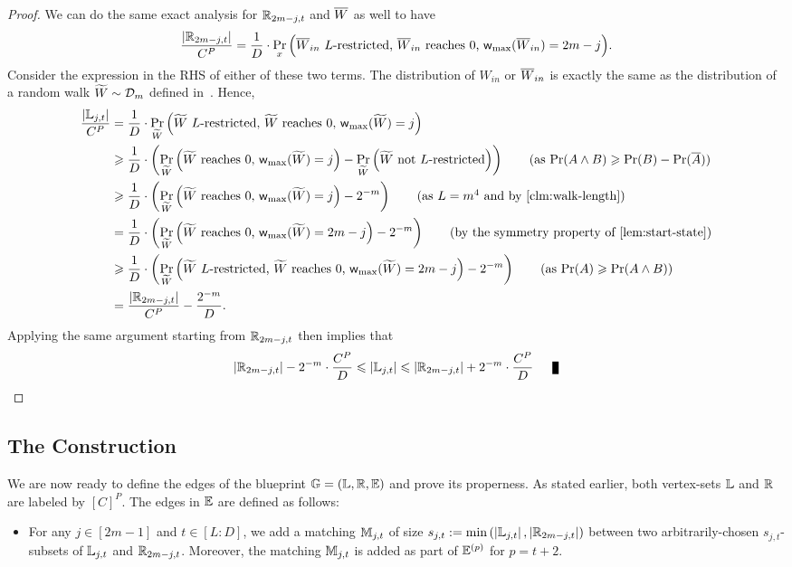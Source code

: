 \begin{proof}
	We can do the same exact analysis for $\mathbb{R}_{2m-j,t}$ and $\overline{W}$ as well to have 
	\[
		\frac{\left\vert{\mathbb{R}_{2m-j,t}}\right\vert}{C^P} = \frac{1}{D} \cdot \operatorname*{\textnormal{Pr}}_{x}\Big(\text{$\overline{W}_{in}$ $L$-restricted, $\overline{W}_{in}$ reaches $0$, $\textnormal{\textsf{w}}_{\textnormal{max}}(\overline{W}_{in})=2m-j$}\Big). 
	\]
	Consider the expression in the RHS of either of these two terms. The distribution of $W_{in}$ or $\overline{W}_{in}$ is exactly the same as the distribution of a random walk $\widetilde{W} \sim \mathcal{D}_m$ defined in~. Hence,  
	\begin{align*}
		\frac{\card{\bL_{j,t}}}{C^P} &=  \frac{1}{D} \cdot \Pr_{\widetilde{W}}\Paren{\text{$\widetilde{W}$ $L$-restricted, $\widetilde{W}$ reaches $0$, $\maxwalk{\widetilde{W}}=j$}} \\
		&\geq \frac{1}{D} \cdot \paren{\Pr_{\widetilde{W}}\Paren{\text{$\widetilde{W}$ reaches $0$, $\maxwalk{\widetilde{W}}=j$}} - \Pr_{\widetilde{W}}\Paren{\text{$\widetilde{W}$ not $L$-restricted}}} \tag{as $\Pr(A \wedge B) \geq \Pr(B) - \Pr(\overline{A})$} \\
		&\geq \frac{1}{D} \cdot \paren{\Pr_{\widetilde{W}}\Paren{\text{$\widetilde{W}$ reaches $0$, $\maxwalk{\widetilde{W}}=j$}} - 2^{-m}} \tag{as $L=m^4$ and by~\Cref{clm:walk-length}} \\ 
		&= \frac{1}{D} \cdot \paren{\Pr_{\widetilde{W}}\Paren{\text{$\widetilde{W}$ reaches $0$, $\maxwalk{\widetilde{W}}=2m-j$}} - 2^{-m}} \tag{by the symmetry property of~\Cref{lem:start-state}} \\
		&\geq \frac{1}{D} \cdot \paren{\Pr_{\widetilde{W}}\Paren{\text{$\widetilde{W}$ $L$-restricted, $\widetilde{W}$ reaches $0$, $\maxwalk{\widetilde{W}}=2m-j$}} - 2^{-m}} \tag{as $\Pr(A) \geq \Pr(A \wedge B)$} \\
		&= \frac{\card{\bR_{2m-j,t}}}{C^P} - \frac{2^{-m}}{D}. 
	\end{align*}
	Applying the same argument starting from $\mathbb{R}_{2m-j,t}$ then implies that 
	\[
		\card{\bR_{2m-j,t}} - 2^{-m} \cdot \frac{C^P}{D} \leq \card{\bL_{j,t}} \leq \card{\bR_{2m-j,t}} + 2^{-m} \cdot \frac{C^P}{D} \qed
	\]
	
\end{proof}

\subsection{The Construction} 

We are now ready to define the edges of the blueprint $\mathbb{G}=(\mathbb{L},\mathbb{R},\mathbb{E})$ and prove its properness. As stated earlier, both vertex-sets $\mathbb{L}$ and $\mathbb{R}$ are labeled by $[C]^P$. The edges in $\mathbb{E}$ are defined as follows: 
\begin{itemize}
	\item For any $j \in [2m-1]$ and $t \in [L:D]$, we add a matching $\mathbb{M}_{j,t}$ of size $s_{j,t} := \min\left(\left\vert{\mathbb{L}_{j,t}}\right\vert,\left\vert{\mathbb{R}_{2m-j,t}}\right\vert\right)$ between two arbitrarily-chosen $s_{j,t}$-subsets of $\mathbb{L}_{j,t}$ and $\mathbb{R}_{2m-j,t}$. Moreover, 
	the matching $\mathbb{M}_{j,t}$ is added as part of $\mathbb{E}^{(p)}$ for $p=t+2$.
\end{itemize}

